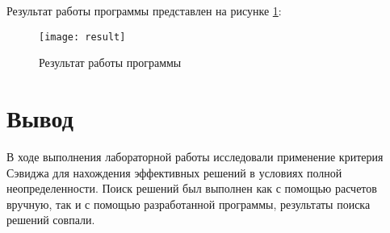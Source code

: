 \documentclass[a4paper,14pt]{extarticle}
\begin{document}
Результат работы программы представлен на рисунке \ref{fig:result}:

\begin{figure}[H]
    \centering
    \texttt{[image: result]}
    \caption{Результат работы программы}
    \label{fig:result}
\end{figure}

\section{Вывод}
В ходе выполнения лабораторной работы исследовали применение критерия Сэвиджа
для нахождения эффективных решений в условиях полной неопределенности. Поиск
решений был выполнен как с помощью расчетов вручную, так и с помощью
разработанной программы, результаты поиска решений совпали.
\end{document}
